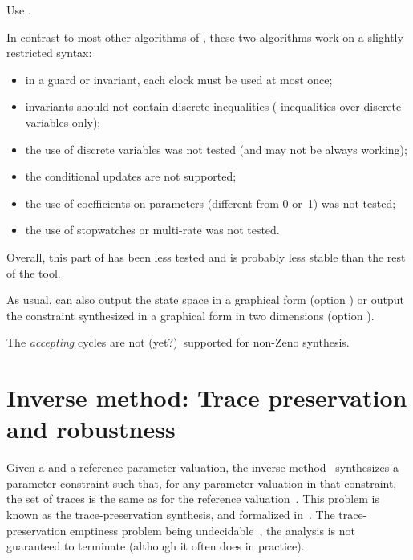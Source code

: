 	      Use .

\begin{becareful}[restrictions]
	In contrast to most other algorithms of \imitator{}, these two algorithms work on a slightly restricted syntax:
	\begin{itemize}
		\item in a guard or invariant, each clock must be used at most once;
		\item invariants should not contain discrete inequalities (\ie{} inequalities over discrete variables only);
		\item the use of discrete variables was not tested (and may not be always working);
		\item the conditional updates are not supported;
		\item the use of coefficients on parameters (different from 0 or~1) was not tested;
		\item the use of stopwatches or multi-rate was not tested.
	\end{itemize}
	Overall, this part of \imitator{} has been less tested and is probably less stable than the rest of the tool.
\end{becareful}

As usual, \imitator{} can also
output the state space in a graphical form (option )
or
output the constraint synthesized in a graphical form in two dimensions (option ).

\begin{remark}
	The \emph{accepting} cycles are not (yet?)\ supported for non-Zeno synthesis.
\end{remark}



\section{Inverse method: Trace preservation and robustness}\label{ss:mode:IM}

Given a \NIPTA{} and a reference parameter valuation, the inverse method~\IM{} synthesizes a parameter constraint such that, for any parameter valuation in that constraint, the set of traces is the same as for the reference valuation~\cite{ACEF09}.
This problem is known as the trace-preservation synthesis, and formalized in~\cite{ALM20}.
The trace-preservation emptiness problem being undecidable~\cite{ALM20}, the analysis is not guaranteed to terminate (although it often does in practice).

